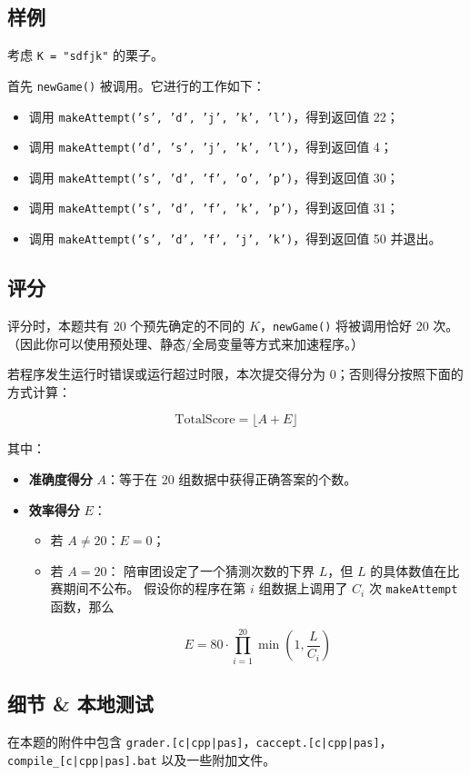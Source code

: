 \documentclass[UTF8, 11pt, a4paper]{article}
\begin{document}
\subsection*{样例}
考虑 \texttt{K = "sdfjk"} 的栗子。

首先 \texttt{newGame()} 被调用。它进行的工作如下：
\begin{itemize}
    \item 调用 \texttt{makeAttempt('s', 'd', 'j', 'k', 'l')}，得到返回值 22；
    \item 调用 \texttt{makeAttempt('d', 's', 'j', 'k', 'l')}，得到返回值 4；
    \item 调用 \texttt{makeAttempt('s', 'd', 'f', 'o', 'p')}，得到返回值 30；
    \item 调用 \texttt{makeAttempt('s', 'd', 'f', 'k', 'p')}，得到返回值 31；
    \item 调用 \texttt{makeAttempt('s', 'd', 'f', 'j', 'k')}，得到返回值 50 并退出。
\end{itemize}

\subsection*{评分}
评分时，本题共有 20 个预先确定的不同的 $K$，\texttt{newGame()} 将被调用恰好 20 次。%
（因此你可以使用预处理、静态/全局变量等方式来加速程序。）

若程序发生运行时错误或运行超过时限，本次提交得分为 0；否则得分按照下面的方式计算：

$$
    \mathrm{TotalScore} = \lfloor A + E \rfloor
$$

其中：
\begin{itemize}
    \item \textbf{准确度得分} $A$：等于在 20 组数据中获得正确答案的个数。
    \item \textbf{效率得分} $E$：
    \begin{itemize}
        \item 若 $A \neq 20$：$E = 0$；
        \item 若 $A = 20$：
            陪审团设定了一个猜测次数的下界 $L$，但 $L$ 的具体数值在比赛期间不公布。
            假设你的程序在第 $i$ 组数据上调用了 $C_i$ 次 \texttt{makeAttempt} 函数，那么

            $$
                E = 80 \cdot \prod_{i = 1}^{20} \min\left(1, \frac{L}{C_i}\right)
            $$
    \end{itemize}
\end{itemize}

\subsection*{细节 \& 本地测试}
在本题的附件中包含 \texttt{grader.[c|cpp|pas]}，\texttt{caccept.[c|cpp|pas]}，%
\texttt{compile\_[c|cpp|pas].bat} 以及一些附加文件。
\end{document}
